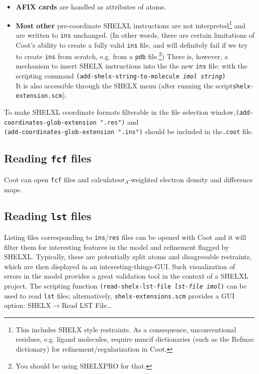 \documentclass{article}
\begin{document}
\begin{itemize}
\item {\bf AFIX cards} are handled as attributes of atoms.

\item {\bf Most other} pre-coordinate SHELXL instructions are not
  interpreted\footnote{This includes SHELX style restraints. As a
    consequence, unconventional residues, e.g. ligand molecules,
    require mmcif dictionaries (such as the Refmac dictionary) for
    refinement/regularization in Coot.} and are written to
  \texttt{ins} unchanged. (In other words, there are certain
  limitations of Coot's ability to create a fully valid \texttt{ins}
  file, and will definitely fail if we try to create \texttt{ins} from
  scratch, e.g. from a \texttt{pdb} file.\footnote{You should be using
    SHELXPRO for that.}) There is, however, a mechanism to insert
  SHELX instructions into the the new \texttt{ins} file: with the
  scripting command \texttt{(add-shelx-string-to-molecule \emph{imol
      string})}\\It is also accessible through the SHELX menu (after
  running the script\linebreak[4]\texttt{shelx-extension.scm}).

\end{itemize}

To make SHELXL coordinate formats filterable in the file selection
window,\linebreak[4]\texttt{(add-coordinates-glob-extension ".res")}
and \\\texttt{(add-coordinates-glob-extension ".ins")} should be
included in the\linebreak[4]\texttt{.coot} file.

\subsection{Reading \texttt{fcf} files}

Coot can open \texttt{fcf} files and 
calculates$\sigma_A$-weighted electron density and
difference maps.

\subsection{Reading \texttt{lst} files}
Listing files corresponding to \texttt{ins}/\texttt{res} files can be
opened with Coot and it will filter them for interesting features in
the model and refinement flagged by SHELXL. Typically, these are
potentially split atoms and disagreeable restraints, which are then
displayed in an interesting-things-GUI. Such visualization of errors
in the model provides a great validation tool in the context of a
SHELXL project. The scripting function \texttt{(read-shelx-lst-file
  \emph{lst-file imol})} can be used to read \texttt{lst} files;
alternatively, \texttt{shelx-extensions.scm} provides a GUI option:
\textsf{SHELX$\to$Read LST File\ldots}
\end{document}
